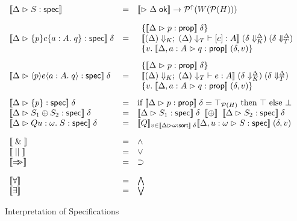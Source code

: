 \begin{figure}
\begin{displaymath}
\begin{array}{lcl}
\interp{\judgeS{S}} & = & \interp{\judgeACtx{\Delta}} \to \upset{W(\powerset{H})} \\ [1em]

\interp{\judgeS{\spec{p}{c}{a:A}{q}}}\;\delta & = & 
   \begin{array}{l}
     \setof{\interp{\judgeA{p}{\assert}}\;\delta} \\
      \interp{\judgeE[\restrictkind{\Delta}]{\restricttype{\Delta}}
                       {\comp{c}}{A}}\;(\restricttyenv{\Delta}{\delta})\;
       (\restrictvals{\Delta}{\delta}) \\
     \setof{v.\; \interp{\judgeA[\Delta, a:A]{q}{\assert}}\;(\delta,v)} \\
   \end{array} 
\\[2em]

\interp{\judgeS{\mspec{p}{e}{a:A}{q}}}\;\delta & = & 
   \begin{array}{l}
     \setof{\interp{\judgeA{p}{\assert}}\;\delta} \\
       \interp{\judgeE[\restrictkind{\Delta}]{\restricttype{\Delta}}
                       {e}{A}}\;(\restricttyenv{\Delta}{\delta})\;
       (\restrictvals{\Delta}{\delta}) \\
     \setof{v.\; \interp{\judgeA[\Delta, a:A]{q}{\assert}}\;(\delta,v)} \\
   \end{array} 
\\[2em]

\interp{\judgeS{\setof{p}}}\;\delta & = & 
  \mbox{if } \interp{\judgeA{p}{\assert}}\;\delta = \top_{\powerset{H}}
  \mbox{ then } \top 
  \mbox{ else } \bot \\

\interp{\judgeS{S_1 \oplus S_2}}\;\delta & = & 
  \interp{\judgeS{S_1}}\;\delta \;\;\interp{\oplus}\;\; 
  \interp{\judgeS{S_2}}\;\delta \\

\interp{\judgeS{Q u:\omega.\; S}}\;\delta & = & 
  \interp{Q}_{v \in \interp{\judgeSort{\omega}}\;\delta} 
     \interp{\judgeS[\Delta, u:\omega]{S}}\;(\delta, v) \\[1em]

\interp{\specand} & = & \land \\
\interp{\specor}  & = & \vee  \\
\interp{\specimp} & = & \implies \\[1em]

\interp{\forall} & = & \bigwedge \\
\interp{\exists} & = & \bigvee \\

\end{array}
\end{displaymath}
\caption{Interpretation of Specifications}
\label{spec-interpretation}  
\end{figure}

